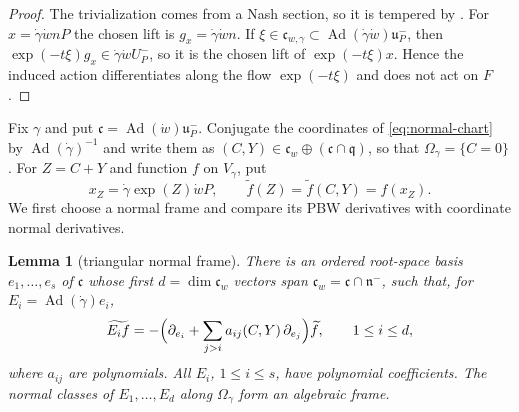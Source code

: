 \documentclass[a4paper,12pt]{amsart}
\numberwithin{equation}{section}
\newtheorem{lemma}[theorem]{Lemma}
\theoremstyle{definition}
\theoremstyle{remark}
\newcommand{\fq}{\mathfrak q}
\newcommand{\fn}{\mathfrak n}
\newcommand{\fc}{\mathfrak c}
\newcommand{\Ad}{\operatorname{Ad}}
\begin{document}
\begin{proof}
The trivialization comes from a Nash section, so it is tempered by \cite[Section~3.3]{CS21}. For $x=\dot\gamma\dot wnP$ the chosen lift is $g_x=\dot\gamma\dot wn$. If $\xi\in\fc_{w,\gamma}\subset\Ad(\dot\gamma\dot w)\mathfrak u_P^-$, then $\exp(-t\xi)g_x\in\dot\gamma\dot wU_P^-$, so it is the chosen lift of $\exp(-t\xi)x$. Hence the induced action differentiates along the flow $\exp(-t\xi)$ and does not act on $F$.
\end{proof}

Fix $\gamma$ and put $\fc=\Ad(\dot w)\mathfrak u_P^-$. Conjugate the coordinates of \eqref{eq:normal-chart} by $\Ad(\dot\gamma)^{-1}$ and write them as $(C,Y)\in\fc_w\oplus(\fc\cap\fq)$, so that $\Omega_\gamma=\{C=0\}$. 
For $Z=C+Y$ and function $f$ on $V_\gamma$, put
\[
 x_Z=\dot\gamma\exp(Z)\dot wP,\qquad
\widetilde f(Z)=\widetilde f(C,Y)=f(x_Z).
\]
We first choose a normal frame and compare its PBW derivatives with coordinate normal derivatives.

\begin{lemma}[triangular normal frame]\label{lem:triangular-normal-frame}
There is an ordered root-space basis $e_1,\dots,e_s$ of $\fc$ whose first $d=\dim\fc_w$ vectors span $\fc_w=\fc\cap\fn^-$, such that, for $E_i=\Ad(\dot\gamma)e_i$,
\begin{equation}\label{eq:first-order}
 \widetilde{E_if}=-\Bigl(\partial_{e_i}+\sum_{j>i}a_{ij}(C,Y)\,\partial_{e_j}\Bigr)\widetilde f,
 \qquad 1\le i\le d,
\end{equation}
where $a_{ij}$ are polynomials. All $E_i$, $1\le i\le s$, have polynomial coefficients. The normal classes of $E_1,\dots,E_d$ along $\Omega_\gamma$ form an algebraic frame.
\end{lemma}
\end{document}
